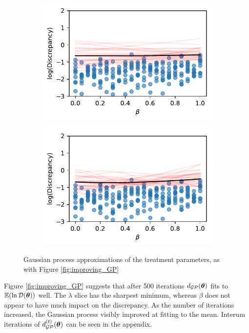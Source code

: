 \begin{figure}[htbp]
\begin{subfigure}[b]{0.5\textwidth}
        \includegraphics[width=\textwidth]{
            ../champagne_GP_images/initial_beta_slice_log_discrep.pdf
        }
    \end{subfigure}%
    \hfill%
    \begin{subfigure}[b]{0.5\textwidth}
        \centering
        \includegraphics[width=\textwidth]{
            ../champagne_GP_images/beta_slice_500_bolfi_updates_log_discrep.pdf
        }
    \end{subfigure}
    \caption{
        Gaussian process approximations of the treatment parameters, as with
        Figure \ref{fig:improving_GP}
    }
    \label{fig:treatment_GP_fig}
\end{figure}

Figure \ref{fig:improving_GP} suggests that after 500 iterations
$d_{\mathcal{GP}}(\bm{\theta})$ fits to $\operatorname{\mathbb{E}}(\ln\mathcal{D}(\bm{\theta}))$ well.
The $\lambda$ slice has the sharpest minimum, whereas $\beta$
does not appear to have much impact on the discrepancy.
As the number of iterations increased, the Gaussian process visibly
improved at fitting to the mean. Interum iterations of $d^{(t)}_{\mathcal{GP}}(\bm{\theta})$
can be seen in the appendix.

